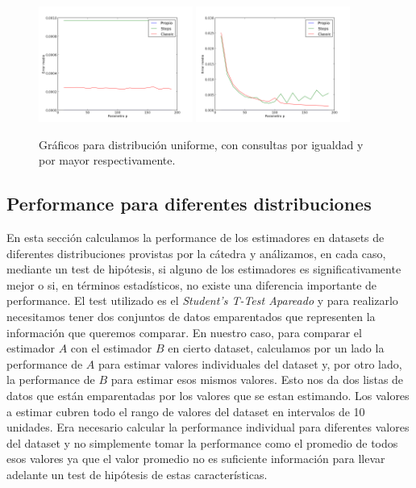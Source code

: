\begin{figure}[h!]  
  \centering
  \includegraphics[width=0.45\textwidth]{images/uniformeEqual}
  \includegraphics[width=0.45\textwidth]{images/uniformeGreater}
  \caption{Gráficos para distribución uniforme, con consultas por igualdad y por mayor respectivamente.}
 \end{figure}



\subsection{Performance para diferentes distribuciones}
En esta sección calculamos la performance de los estimadores en datasets de diferentes distribuciones provistas por la cátedra y análizamos, en cada caso, mediante un test de hipótesis, si alguno de los estimadores es significativamente mejor o si, en términos estadísticos, no existe una diferencia importante de performance. 
El test utilizado es el \textit{Student’s T-Test Apareado} y para realizarlo necesitamos tener dos conjuntos de datos emparentados que representen la información que queremos comparar. En nuestro caso, para comparar el estimador $A$ con el estimador $B$ en cierto dataset, calculamos por un lado la performance de $A$ para estimar valores individuales del dataset y, por otro lado, la performance de $B$ para estimar esos mismos valores. Esto nos da dos listas de datos que están emparentadas por los valores que se estan estimando. Los valores a estimar cubren todo el rango de valores del dataset en intervalos de 10 unidades. Era necesario calcular la performance individual para diferentes valores del dataset y no simplemente tomar la performance como el promedio de todos esos valores ya que el valor promedio no es suficiente información para llevar adelante un test de hipótesis de estas características.

